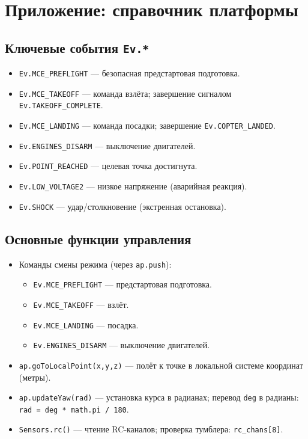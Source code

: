 \section{Приложение: справочник платформы}
\subsection{Ключевые события \texttt{Ev.*}}
\begin{itemize}
  \item \texttt{Ev.MCE\_PREFLIGHT} — безопасная предстартовая подготовка.
  \item \texttt{Ev.MCE\_TAKEOFF} — команда взлёта; завершение сигналом \texttt{Ev.TAKEOFF\_COMPLETE}.
  \item \texttt{Ev.MCE\_LANDING} — команда посадки; завершение \texttt{Ev.COPTER\_LANDED}.
  \item \texttt{Ev.ENGINES\_DISARM} — выключение двигателей.
  \item \texttt{Ev.POINT\_REACHED} — целевая точка достигнута.
  \item \texttt{Ev.LOW\_VOLTAGE2} — низкое напряжение (аварийная реакция).
  \item \texttt{Ev.SHOCK} — удар/столкновение (экстренная остановка).
\end{itemize}

\subsection{Основные функции управления}
\begin{itemize}
  \item Команды смены режима (через \texttt{ap.push}):
  \begin{itemize}
      \item \texttt{Ev.MCE\_PREFLIGHT} — предстартовая подготовка.
      \item \texttt{Ev.MCE\_TAKEOFF} — взлёт.
      \item \texttt{Ev.MCE\_LANDING} — посадка.
      \item \texttt{Ev.ENGINES\_DISARM} — выключение двигателей.
  \end{itemize}
  \item \texttt{ap.goToLocalPoint(x,y,z)} — полёт к точке в локальной системе координат (метры).
  \item \texttt{ap.updateYaw(rad)} — установка курса в радианах; перевод \texttt{deg} в радианы: \\ \texttt{rad = deg * math.pi / 180}.
  \item \texttt{Sensors.rc()} — чтение RC‑каналов; проверка тумблера: \texttt{rc\_chans[8]}.
\end{itemize}


